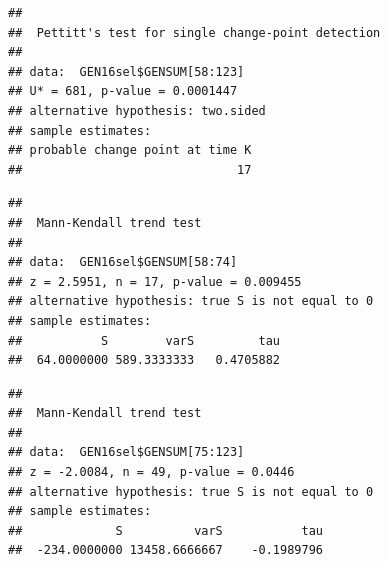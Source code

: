 \documentclass[12pt,]{article}
\newenvironment{Shaded}{\begin{snugshade}}{\end{snugshade}}
\newcommand{\KeywordTok}[1]{\textcolor[rgb]{0.13,0.29,0.53}{\textbf{#1}}}
\newcommand{\DecValTok}[1]{\textcolor[rgb]{0.00,0.00,0.81}{#1}}
\newcommand{\CommentTok}[1]{\textcolor[rgb]{0.56,0.35,0.01}{\textit{#1}}}
\newcommand{\OperatorTok}[1]{\textcolor[rgb]{0.81,0.36,0.00}{\textbf{#1}}}
\newcommand{\NormalTok}[1]{#1}
\begin{document}
\begin{Shaded}
\end{Shaded}

\begin{verbatim}
## 
##  Pettitt's test for single change-point detection
## 
## data:  GEN16sel$GENSUM[58:123]
## U* = 681, p-value = 0.0001447
## alternative hypothesis: two.sided
## sample estimates:
## probable change point at time K 
##                              17
\end{verbatim}

\begin{Shaded}
\end{Shaded}

\begin{verbatim}
## 
##  Mann-Kendall trend test
## 
## data:  GEN16sel$GENSUM[58:74]
## z = 2.5951, n = 17, p-value = 0.009455
## alternative hypothesis: true S is not equal to 0
## sample estimates:
##           S        varS         tau 
##  64.0000000 589.3333333   0.4705882
\end{verbatim}

\begin{Shaded}
\end{Shaded}

\begin{verbatim}
## 
##  Mann-Kendall trend test
## 
## data:  GEN16sel$GENSUM[75:123]
## z = -2.0084, n = 49, p-value = 0.0446
## alternative hypothesis: true S is not equal to 0
## sample estimates:
##             S          varS           tau 
##  -234.0000000 13458.6666667    -0.1989796
\end{verbatim}
\end{document}
